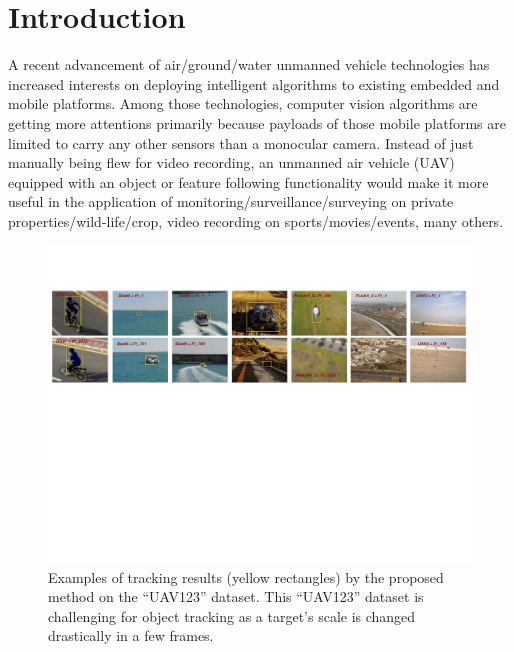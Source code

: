 \documentclass[10pt,twocolumn,letterpaper]{article}
\begin{document}
\section{Introduction}
\label{introduction}
A recent advancement of air/ground/water unmanned vehicle technologies
has increased interests on deploying intelligent algorithms to
existing embedded and mobile platforms. Among those technologies,
computer vision algorithms are getting more attentions primarily
because payloads of those mobile platforms are limited to carry any
other sensors than a monocular camera. Instead of just manually being
flew for video recording, an unmanned air vehicle (UAV) equipped with
an object or feature following functionality would make it more useful
in the application of monitoring/surveillance/surveying on private
properties/wild-life/crop, video recording on sports/movies/events,
many others.

\begin{figure}[!h]
\centering
\includegraphics[width=\textwidth]{./figures/ResultsIntroduction.pdf}
\caption{Examples of tracking results (yellow rectangles) by the
  proposed method on the ``UAV123'' dataset. This ``UAV123'' dataset
  is challenging for object tracking as a target's scale is changed
  drastically in a few frames.}
\label{ResultsIntroduction}
\end{figure}
\end{document}
